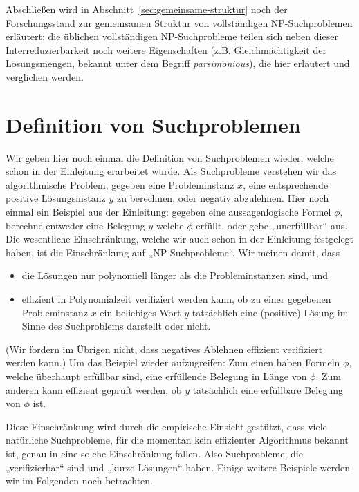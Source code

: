 Abschließen wird in Abschnitt~\ref{sec:gemeinsame-struktur} noch der Forschungsstand zur gemeinsamen Struktur von vollständigen NP-Suchproblemen erläutert: die üblichen vollständigen NP-Suchprobleme teilen sich neben dieser Interreduzierbarkeit noch weitere Eigenschaften (z.B. Gleichmächtigkeit der Lösungsmengen, bekannt unter dem Begriff \emph{parsimonious}), die hier erläutert und verglichen werden. 

\section{Definition von Suchproblemen}\label{sec:searchproblems-def}

Wir geben hier noch einmal die Definition von Suchproblemen wieder, welche schon in der Einleitung erarbeitet wurde.
Als Suchprobleme verstehen wir das algorithmische Problem, gegeben eine Probleminstanz $x$, eine entsprechende positive Lösungsinstanz $y$ zu berechnen, oder negativ abzulehnen.  Hier noch einmal ein Beispiel aus der Einleitung: gegeben eine aussagenlogische Formel $\phi$, berechne entweder eine Belegung $y$ welche $\phi$ erfüllt, oder gebe „unerfüllbar“ aus.
Die wesentliche Einschränkung, welche wir auch schon in der Einleitung festgelegt haben, ist die Einschränkung auf „NP-Suchprobleme“. Wir meinen damit, dass
\begin{itemize}
    \item die Lösungen nur polynomiell länger als die Probleminstanzen sind, und
    \item effizient in Polynomialzeit verifiziert werden kann, ob zu einer gegebenen Probleminstanz $x$ ein beliebiges Wort $y$ tatsächlich eine (positive) Lösung im Sinne des Suchproblems darstellt oder nicht.
\end{itemize}
(Wir fordern im Übrigen nicht, dass negatives Ablehnen effizient verifiziert werden kann.)
Um das Beispiel wieder aufzugreifen: Zum einen haben Formeln $\phi$, welche überhaupt erfüllbar sind, eine erfüllende Belegung in Länge von $\phi$. Zum anderen kann effizient geprüft werden, ob $y$ tatsächlich eine erfüllbare Belegung von $\phi$ ist.

Diese Einschränkung wird durch die empirische Einsicht gestützt, dass viele natürliche Suchprobleme, für die momentan kein effizienter Algorithmus bekannt ist, genau in eine solche Einschränkung fallen. Also Suchprobleme, die „verifizierbar“ sind und „kurze Lösungen“ haben. Einige weitere Beispiele werden wir im Folgenden noch betrachten.

